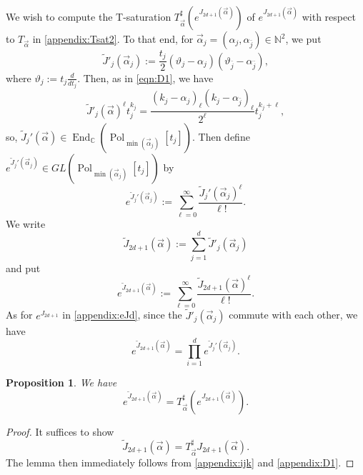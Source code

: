 \documentclass[a4paper,11pt,reqno]{amsart}
\newcommand{\CC}{\mathbb{C}}
\newcommand{\NN}{\mathbb{N}}
\newcommand{\0}{{\bf 0}}
\newcommand{\1}{{\bf 1}}
\DeclareMathOperator{\End}{End}
\DeclareMathOperator{\Pol}{Pol}
\newcommand{\wJ}{\widetilde{J}}
\newcommand{\valpha}{\vec{\alpha}}
\theoremstyle{plain}
\newtheorem{proposition}[equation]{Proposition}
\theoremstyle{definition}
\numberwithin{equation}{section}
\theoremstyle{definition}
\begin{document}
\begin{appendices}
We wish to compute the T-saturation 
$T_{\valpha}^\sharp (e^{ J_{2d+1}(\valpha)})$ of $e^{J_{2d+1}(\valpha)}$
with respect to $T_{\valpha}$ in \eqref{appendix:Tsat2}.
To that end, 
for $\valpha_j=(\alpha_j,\alpha_{\bar{j}}) \in \NN^2$, we put
\begin{equation}\label{appendix:Da}
\wJ'_j(\valpha_j):=\frac{t_j}{2}(\vartheta_j-\alpha_j)(\vartheta_{\bar{j}}-\alpha_{\bar{j}}),
\end{equation}
where $\vartheta_j:=t_j \frac{d}{d t_j}$.
Then, as in \eqref{eqn:D1}, we have
\begin{equation}\label{appendix:D1}
\wJ'_j(\valpha)^\ell t_j^{k_j} 
=\frac{(k_j-\alpha_j)_\ell(k_j-\alpha_{\bar{j}})_\ell}{2^\ell}
t_j^{k_j+\ell},
\end{equation}
so, $\wJ_j'(\valpha) \in \End_\CC(\Pol_{\min(\valpha_j)}[t_j])$.
Then define 
$e^{\wJ_j'(\valpha_j)} \in GL(\Pol_{\min(\valpha_j)}[t_j])$ by
\begin{equation*}
e^{\wJ_j'(\valpha_j)}
:=\sum_{\ell=0}^\infty \frac{\wJ_j'(\valpha_j)^\ell}{\ell!}.
\end{equation*}
We write
\begin{equation*}
\wJ_{2d+1}(\valpha):=\sum_{j=1}^{d}\wJ'_j(\valpha_j)
\end{equation*}
and put
\begin{equation*}
e^{\wJ_{2d+1}(\valpha)}
:=\sum_{\ell=0}^\infty \frac{\wJ_{2d+1}(\valpha)^\ell}{\ell!}.
\end{equation*}
As for $e^{J_{2d+1}}$ in \eqref{appendix:eJd}, 
since the $\wJ'_j(\valpha_j)$ commute with each other, we have 
\begin{equation}\label{appendix:e_wJ_j}
e^{\wJ_{2d+1}(\valpha)}=\prod_{i=1}^d e^{\wJ_j'(\valpha_j)}.
\end{equation}

\begin{proposition}\label{appendix:DD}
We have 
\begin{equation*}
e^{\wJ_{2d+1}(\valpha)}=T_{\valpha}^\sharp (e^{ J_{2d+1}(\valpha)}).
\end{equation*}
\end{proposition}

\begin{proof}
It suffices to show
\begin{equation*}
\wJ_{2d+1}(\valpha)=T_{\valpha}^\sharp J_{2d+1}(\valpha).
\end{equation*}
The lemma then immediately follows from \eqref{appendix:ijk} and \eqref{appendix:D1}.
\end{proof}


\end{appendices}
\end{document}

